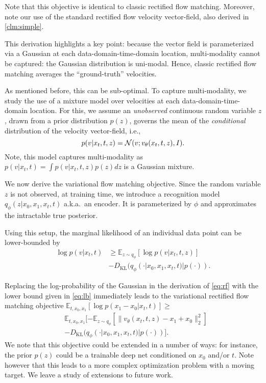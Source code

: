 Note that this objective is identical to classic rectified flow matching. Moreover, note our use of the standard rectified flow velocity vector-field, also derived in \cref{clm:simple}.

This derivation highlights a key point: because the vector field is parameterized via a  Gaussian at each data-domain-time-domain location, multi-modality cannot be captured: the Gaussian distribution is uni-modal. Hence, classic rectified flow matching  averages the ``ground-truth'' velocities.

As mentioned before, this can be sub-optimal. 
To capture multi-modality, we study the use of a mixture model over velocities at each data-domain-time-domain location. For this, we assume an \emph{unobserved} continuous random variable $z$, drawn from a prior distribution $p(z)$, governs the mean of the \emph{conditional} distribution of the velocity vector-field, i.e., 
$$
p(v|x_t,t,z) = {\cal N}(v; v_\theta(x_t,t,z),I).
$$
Note, this model captures multi-modality as $p(v|x_t,t) = \int p(v|x_t,t,z)p(z)dz$ is a Gaussian mixture. %

We now derive the variational flow matching objective. Since the random variable $z$ is not observed, at training time, we introduce a  recognition model $q_\phi(z|x_0,x_1,x_t,t)$ a.k.a.\ an encoder. It is parameterized by $\phi$ and  approximates the intractable true posterior.

Using this setup, the marginal likelihood of an individual data point can be lower-bounded by 
\begin{equation}
\begin{split}
\log p(v|x_t,t) & \geq \mathbb{E}_{z\sim q_\phi}\left[\log p(v|x_t,t,z)\right] \\
&- D_\text{KL}(q_\phi(\cdot|x_0,x_1,x_t,t)|p(\cdot)).
\end{split}
\label{eq:lb}
\end{equation}

Replacing the log-probability of the Gaussian in the derivation of \cref{eq:rf} with the lower bound given in \cref{eq:lb} immediately leads to the variational rectified flow matching objective $\mathbb{E}_{t,x_0,x_1}\left[\log p(x_1-x_0|x_t,t)\right] \geq $
\begin{equation}
\begin{split}
&\mathbb{E}_{t,x_0,x_1}[-\mathbb{E}_{z\sim q_\phi}\left[\|v_\theta(x_t,t,z) - x_1 + x_0\|_2^2\right] \\
& - D_\text{KL}(q_\phi(\cdot|x_0,x_1,x_t,t)|p(\cdot))].
\end{split}
\label{eq:vrfmobj}
\end{equation}
We note that this objective could be extended in a number of ways: for instance, the prior $p(z)$ could be a trainable deep net conditioned on $x_0$ and/or $t$. Note however that this leads to a more complex optimization problem with a moving target. We leave a study of  extensions to future work.

